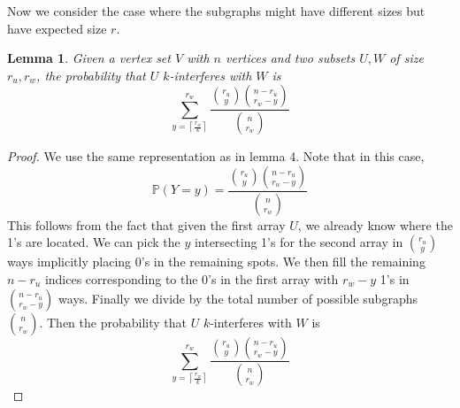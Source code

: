 \documentclass[10pt]{extarticle}
\newtheorem{lemma}[theorem]{Lemma}
\theoremstyle{definition}
\begin{document}



Now we consider the case where the subgraphs might have different sizes but have expected size $r$.

\begin{lemma}
    Given a vertex set $V$ with $n$ vertices and two subsets $U,W$ of size $r_u,r_w$, the probability that $U$ $k$-interferes with $W$ is 
    \begin{equation*}
        \sum_{y = \left\lceil \frac{r_w}{k} \right\rceil}^{r_w}  \frac{\binom{r_u}{y} \binom{n-r_u}{r_w-y}}{\binom{n}{r_w}}
    \end{equation*}
\end{lemma}
\begin{proof}
    We use the same representation as in lemma 4. Note that in this case,
    \begin{equation}
        \mathbb{P}(Y=y) = \frac{\binom{r_u}{y} \binom{n-r_u}{r_w-y}}{\binom{n}{r_w}}
    \end{equation}
    This follows from the fact that given the first array $U$, we already know where the 1's are located. We can pick the $y$ intersecting 1's for the second array in $\binom{r_u}{y}$ ways implicitly placing 0's in the remaining spots. We then fill the remaining $n-r_u$ indices corresponding to the 0's in the first array with $r_w-y$ 1's in $\binom{n-r_u}{r_w-y}$ ways. Finally we divide by the total number of possible subgraphs $\binom{n}{r_w}$. 
    Then the probability that $U$ $k$-interferes with $W$ is 
    \begin{equation}
        \sum_{y = \left\lceil \frac{r_w}{k} \right\rceil}^{r_w}  \frac{\binom{r_u}{y} \binom{n-r_u}{r_w-y}}{\binom{n}{r_w}}
    \end{equation}
\end{proof}
\end{document}
